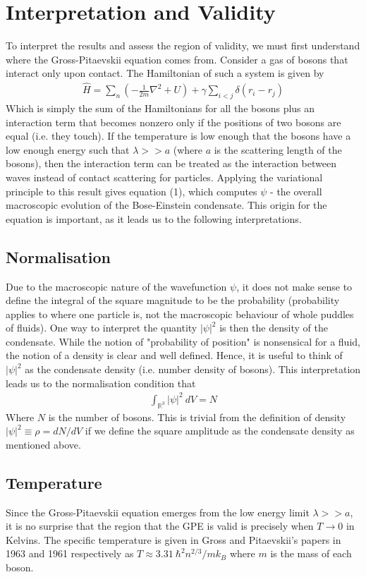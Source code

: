 \documentclass{article}
\begin{document}
\section{Interpretation and Validity}
To interpret the results
and assess the region of validity,
 we must first understand where the Gross-Pitaevskii equation comes from. Consider a gas of bosons that interact 
 only upon contact. The Hamiltonian of such a system is given by 
\begin{align}
    \hat{H}=\sum_n(-\frac{1}{2m}\nabla^2+U)+\gamma\sum_{i<j}\delta(r_i-r_j)
\end{align}
Which is simply the sum of the Hamiltonians for all the bosons plus an interaction term that becomes 
nonzero only if the positions of two bosons are equal (i.e. they touch). If the temperature is low enough that 
the bosons have a low enough energy such that $\lambda>>a$ (where $a$ is the scattering length of the bosons), 
then the interaction term can be treated as the interaction between waves instead of contact 
scattering for particles. Applying the variational principle to this result gives equation (1), which computes 
$\psi$ - the overall macroscopic evolution of the Bose-Einstein condensate.
 This origin for the equation is important, as it leads us to the 
following interpretations.
\subsection{Normalisation}
Due to the macroscopic nature of the wavefunction $\psi$, it does not make sense to define the integral of 
the square magnitude to be the probability (probability applies to where one particle is, not the macroscopic 
behaviour of whole puddles of fluids). One way to interpret the quantity $|\psi|^2$ is then the density of the condensate. While the notion of "probability of position" is 
nonsensical for a fluid, the notion of a density is clear and well defined. Hence, it is useful to 
think of $|\psi|^2$ as the condensate density (i.e. number density of bosons).
This interpretation leads us to the normalisation condition that 
\begin{align}
    \int_{\mathbb{R}^3}|\psi|^2\ dV = N
\end{align}
Where $N$ is the number of bosons. This is trivial from the definition of density $|\psi|^2\equiv\rho=dN/dV$
if we define the square amplitude as the condensate density as mentioned above.
\subsection{Temperature}
Since the Gross-Pitaevskii equation emerges from the low energy limit $\lambda>>a$,
 it is no surprise that 
the region that the GPE is valid is precisely when $T\to0$ in Kelvins. 
The specific temperature is given in Gross and Pitaevskii's papers in 1963 and 1961 respectively as 
$T\approx3.31\ \hbar^2n^{2/3}/mk_B$ where $m$ is the mass of each boson.
\end{document}
